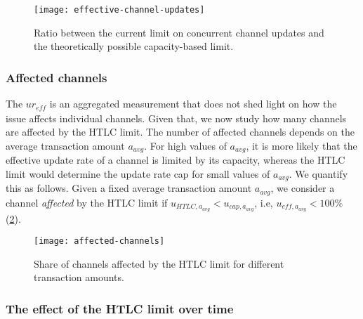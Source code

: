 \begin{figure}[tb]
	\centering
	\texttt{[image: effective-channel-updates]}
	\caption{Ratio between the current limit on concurrent channel updates and the theoretically possible 
		capacity-based limit.\label{fig:effective-channel-updates}}
\end{figure}

\subsubsection*{Affected channels}
The $ur_\textit{eff}$ is an aggregated measurement that does not shed 
light on how the issue affects individual channels.  
Given that, we now study how many channels are affected by the HTLC limit.
The number of affected channels depends on the average transaction amount $a_\textit{avg}$. 
For high values of $a_\textit{avg}$, it is more likely that 
the effective update rate of a channel is limited by its capacity, 
whereas the HTLC limit would determine the update rate cap for small values of $a_\textit{avg}$.
We quantify this as follows.
Given a fixed average transaction amount $a_\textit{avg}$, 
we consider a channel \textit{affected} by the HTLC limit if $u_{\textit{HTLC},a_\textit{avg}} < u_{\textit{cap},a_\textit{avg}}$, i.e, $u_{\textit{eff},a_\textit{avg}} < 100\%$ (\cref{fig:affected-channels}).

\begin{figure}[tb]
	\centering
	\texttt{[image: affected-channels]}
	\caption{Share of channels affected by the HTLC limit for different transaction amounts. \label{fig:affected-channels}}
\end{figure}



\subsubsection*{The effect of the HTLC limit over time}


